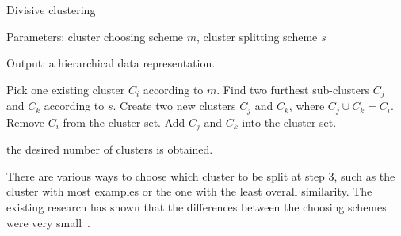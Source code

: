 \begin{algorithm}[ht!]
	\caption{Divisive clustering}
    
    Parameters: cluster choosing scheme $m$, cluster splitting scheme $s$
    
    Output: a hierarchical data representation.
    
	\begin{algorithmic}[1] 
		
        \REPEAT
		
		
		\STATE Pick one existing cluster $C_i$ according to $m$.
		\STATE Find two furthest sub-clusters $C_j$ and $C_k$ according to $s$.  
		\STATE Create two new clusters $C_j$ and $C_k$, where $C_j \cup C_k = C_i$. 
		\STATE Remove $C_i$ from the cluster set. 
		\STATE Add $C_j$ and $C_k$ into the cluster set. 
				
		\UNTIL the desired number of clusters is obtained.
		
	\end{algorithmic}
	
\end{algorithm}

There are various ways to choose which cluster to be split at step 3, such as the cluster with most examples or the one with the least overall similarity. The existing research has shown that the differences between the choosing schemes were very small~\cite{Steinbach2000}. 

